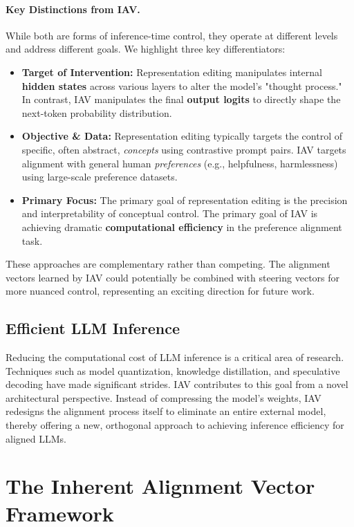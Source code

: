 \documentclass{article}
\begin{document}
\paragraph{Key Distinctions from IAV.} While both are forms of inference-time control, they operate at different levels and address different goals. We highlight three key differentiators:
\begin{itemize}
    \item \textbf{Target of Intervention:} Representation editing manipulates internal \textbf{hidden states} across various layers to alter the model's "thought process." In contrast, IAV manipulates the final \textbf{output logits} to directly shape the next-token probability distribution.
    \item \textbf{Objective \& Data:} Representation editing typically targets the control of specific, often abstract, \textit{concepts} using contrastive prompt pairs. IAV targets alignment with general human \textit{preferences} (e.g., helpfulness, harmlessness) using large-scale preference datasets.
    \item \textbf{Primary Focus:} The primary goal of representation editing is the precision and interpretability of conceptual control. The primary goal of IAV is achieving dramatic \textbf{computational efficiency} in the preference alignment task.
\end{itemize}
These approaches are complementary rather than competing. The alignment vectors learned by IAV could potentially be combined with steering vectors for more nuanced control, representing an exciting direction for future work.

\subsection{Efficient LLM Inference}
Reducing the computational cost of LLM inference is a critical area of research. Techniques such as model quantization, knowledge distillation, and speculative decoding \citep{leviathan2023fast} have made significant strides. IAV contributes to this goal from a novel architectural perspective. Instead of compressing the model's weights, IAV redesigns the alignment process itself to eliminate an entire external model, thereby offering a new, orthogonal approach to achieving inference efficiency for aligned LLMs.
\section{The Inherent Alignment Vector Framework}
\end{document}
